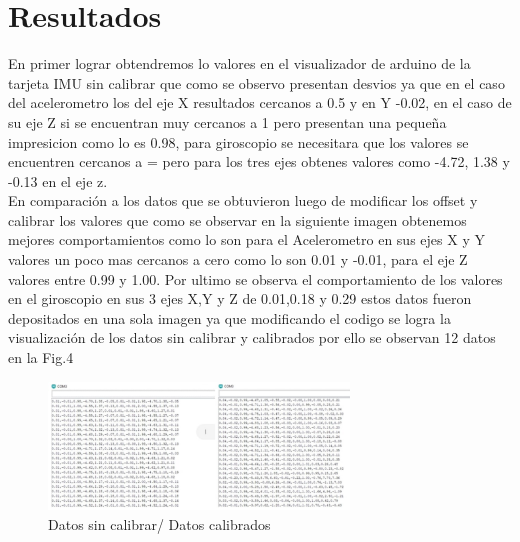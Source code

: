 \section{Resultados} \label{sec:resultados}
En primer lograr obtendremos lo valores en el visualizador de arduino de la tarjeta IMU sin calibrar \cite{segovia2018adquisicion} que como se observo presentan desvios ya que en el caso del acelerometro los del eje X resultados cercanos a 0.5 y en Y -0.02, en el caso de su eje Z si se encuentran muy cercanos a 1 pero presentan una pequeña impresicion como lo es 0.98, para giroscopio se necesitara que los valores se encuentren cercanos a = pero para los tres ejes obtenes valores como -4.72, 1.38 y -0.13 en el eje z.\\
En comparación a los datos que se obtuvieron luego de modificar los offset \cite{rodriguez2001introduccion} y calibrar los valores que como se observar en la siguiente imagen obtenemos mejores comportamientos como lo son para el Acelerometro en sus ejes X y Y valores un poco mas cercanos a cero como lo son 0.01 y -0.01, para el eje Z valores entre 0.99 y 1.00. Por ultimo se observa el comportamiento de los valores en el giroscopio en sus 3 ejes X,Y y Z de 0.01,0.18 y 0.29 estos datos fueron depositados en una sola imagen ya que modificando el codigo se logra la visualización de los datos sin calibrar y calibrados por ello se observan 12 datos en la Fig.4

\begin{figure}[htbp]
\centering
\includegraphics[width=8cm]{Figuras/calibrados_sincalibrar.jpg}
\caption{Datos sin calibrar/ Datos calibrados}
\label{fig:calibrados_sincalibrar}
\end{figure}

